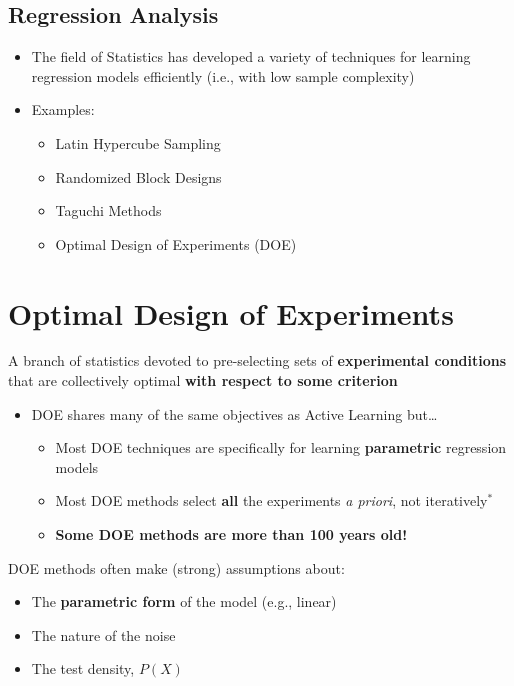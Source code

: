 \documentclass[10pt]{article}
\begin{document}
\subsection*{Regression Analysis}
\begin{itemize}
	\item The field of Statistics has developed a variety of techniques for learning regression models efficiently (i.e., with low sample complexity)
	\item Examples:
	\begin{itemize}
	    \item Latin Hypercube Sampling
	    \item Randomized Block Designs
	    \item Taguchi Methods
	    \item Optimal Design of Experiments (DOE)
    \end{itemize}
\end{itemize}

\section*{Optimal Design of Experiments}
A branch of statistics devoted to pre-selecting sets of \textbf{experimental conditions} that are collectively optimal \textbf{with respect to some criterion}
\begin{itemize}
	\item DOE shares many of the same objectives as Active Learning but\dots
	\begin{itemize}
	    \item Most DOE techniques are specifically for learning \textbf{parametric} regression models
	    \item Most DOE methods select \textbf{all} the experiments \textit{a priori}, not iteratively$^*$
	    \item \textbf{Some DOE methods are more than 100 years old!}
    \end{itemize}
\end{itemize}
DOE methods often make (strong) assumptions about:
\begin{itemize}
	\item The \textbf{parametric form} of the model (e.g., linear)
	\item The nature of the noise
	\item The test density, $P(X)$
\end{itemize}
\end{document}
